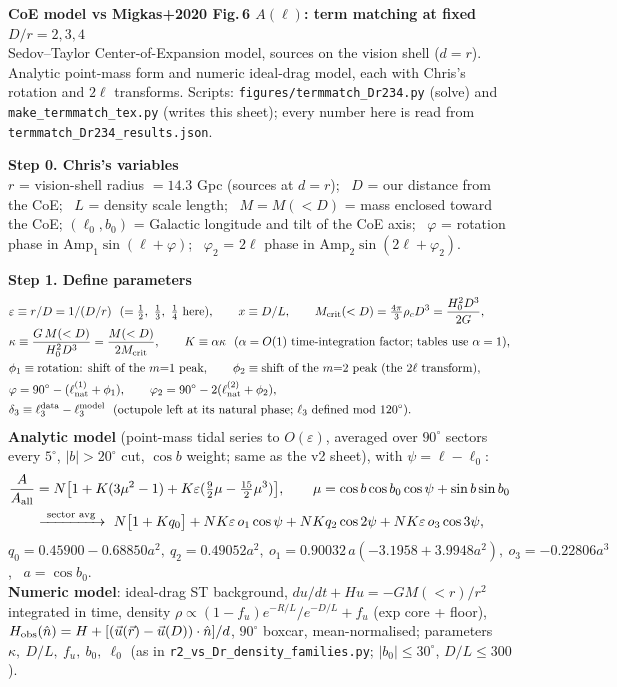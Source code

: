 \documentclass[10pt]{article}
\begin{document}
{\large\textbf{CoE model vs Migkas+2020 Fig.\,6 $A(\ell)$: term matching at fixed $D/r=2,3,4$}}\\[2pt]
Sedov--Taylor Center-of-Expansion model, sources on the vision shell ($d=r$). Analytic point-mass form and numeric ideal-drag model, each with Chris's rotation and $2\ell$ transforms.
Scripts: \texttt{figures/termmatch\_Dr234.py} (solve) and \texttt{make\_termmatch\_tex.py} (writes this sheet); every number here is read from \texttt{termmatch\_Dr234\_results.json}.

\medskip\textbf{Step 0. Chris's variables}\\
$r$ = vision-shell radius $=14.3$ Gpc (sources at $d=r$); \ $D$ = our distance from the CoE; \ $L$ = density scale length; \ $M=M(<D)$ = mass enclosed toward the CoE;
$(\ell_0,b_0)$ = Galactic longitude and tilt of the CoE axis; \ $\varphi$ = rotation phase in $\mathrm{Amp}_1\sin(\ell+\varphi)$; \ $\varphi_2$ = $2\ell$ phase in $\mathrm{Amp}_2\sin(2\ell+\varphi_2)$.

\medskip\textbf{Step 1. Define parameters}
\begin{align*}
&\varepsilon\equiv r/D=1/(D/r)\ \ (=\tfrac12,\ \tfrac13,\ \tfrac14\ \text{here}),\qquad x\equiv D/L,\qquad
M_{\rm crit}(<D)=\tfrac{4\pi}{3}\rho_cD^3=\frac{H_0^2D^3}{2G},\\
&\kappa\equiv\frac{G\,M(<D)}{H_0^2D^3}=\frac{M(<D)}{2M_{\rm crit}},\qquad K\equiv\alpha\kappa\ \ (\alpha=O(1)\text{ time-integration factor; tables use }\alpha=1),\\
&\phi_1\equiv\text{rotation: shift of the }m{=}1\text{ peak},\qquad \phi_2\equiv\text{shift of the }m{=}2\text{ peak (the }2\ell\text{ transform)},\\
&\varphi=90^\circ-(\ell^{(1)}_{\rm nat}+\phi_1),\qquad \varphi_2=90^\circ-2(\ell^{(2)}_{\rm nat}+\phi_2),\\
&\delta_3\equiv\ell_3^{\rm data}-\ell_3^{\rm model}\ \ (\text{octupole left at its natural phase; }\ell_3\text{ defined mod }120^\circ).
\end{align*}
\textbf{Analytic model} (point-mass tidal series to $O(\varepsilon)$, averaged over $90^\circ$ sectors every $5^\circ$, $|b|>20^\circ$ cut, $\cos b$ weight; same as the v2 sheet), with $\psi=\ell-\ell_0$:
\begin{align*}
\frac{A}{A_{\rm all}}&=N\big[1+K(3\mu^2-1)+K\varepsilon(\tfrac92\mu-\tfrac{15}{2}\mu^3)\big],\qquad \mu=\cos b\cos b_0\cos\psi+\sin b\sin b_0\\
&\xrightarrow{\ \text{sector avg}\ }\ N\big[1+Kq_0\big]+NK\varepsilon\,o_1\cos\psi+NKq_2\cos2\psi+NK\varepsilon\,o_3\cos3\psi,
\end{align*}
$q_0=0.45900-0.68850a^2,\ q_2=0.49052a^2,\ o_1=0.90032\,a(-3.1958+3.9948a^2),\ o_3=-0.22806a^3$, \ $a=\cos b_0$.\\
\textbf{Numeric model}: ideal-drag ST background, $du/dt+Hu=-GM(<r)/r^2$ integrated in time, density $\rho\propto(1-f_u)e^{-R/L}/e^{-D/L}+f_u$ (exp core + floor),
$H_{\rm obs}(\hat n)=H+[(\vec u(\vec r)-\vec u(D))\cdot\hat n]/d$, $90^\circ$ boxcar, mean-normalised; parameters $\kappa,\ D/L,\ f_u,\ b_0,\ \ell_0$ (as in \texttt{r2\_vs\_Dr\_density\_families.py}; $|b_0|\le30^\circ$, $D/L\le300$).
\end{document}
